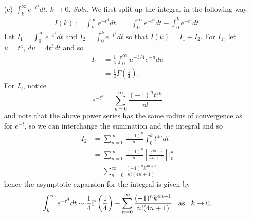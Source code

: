 \documentclass{article}
\begin{document}
\begin{itemize}
\begin{itemize}
        \item[(c)] ${\displaystyle \int_k^{\infty}e^{-t^4}dt}$, $k \to 0$.
        \newline\newline
        \textit{Soln.} We first split up the integral in the following way:
        \begin{align*}
            I(k) := \int_{k}^{\infty} e^{-t^4}dt &= \int_0^{\infty}e^{-t^4}dt - \int_0^k e^{-t^4}dt.
        \end{align*}
        Let ${ \displaystyle I_1 = \int_0^{\infty}e^{-t^4}dt }$ and ${\displaystyle I_2 = \int_0 ^k e^{-t^4}dt }$ so that $I(k) = I_1 + I_2$. For $I_1$, let $u = t^4$, $du = 4t^3dt$ and so
        \begin{align*}
            I_1 &= \frac{1}{4}\int_0^{\infty} u^{-3/4}e^{-u}du\\
            &= \frac{1}{4}\Gamma\left(\frac{1}{4}\right).
        \end{align*}
        For $I_2$, notice
        \[e^{-t^4} = \sum_{n = 0}^{\infty} \frac{(-1)^nt^{4n}}{n!}\]
        and note that the above power series has the same radius of convergence as for $e^{-t}$, so we can interchange the summation and the integral and so
        \begin{align*}
            I_2 &= \sum_{n = 0}^{\infty} \frac{(-1)^n}{n!}\int_0^k t^{4n}dt\\
            &= \sum_{n = 0}^{\infty} \frac{(-1)^n}{n!}\left[\frac{t^{4n+1}}{4n+1}\right]\bigg|_0^k\\
            &= \sum_{n = 0}^{\infty} \frac{(-1)^nk^{4n+1}}{n!(4n+1)}
        \end{align*}
        hence the asymptotic expansion for the integral is given by
        \[\int_k^{\infty}e^{-t^4}dt \sim \frac{1}{4}\Gamma\left(\frac{1}{4}\right) - \sum_{n = 0}^{\infty} \frac{(-1)^nk^{4n + 1}}{n!(4n+1)} \hspace{0.3cm} \text{as} \hspace{0.3cm} k \to 0.\]
    \end{itemize}
    \pagebreak
    

\end{itemize}
\end{document}
